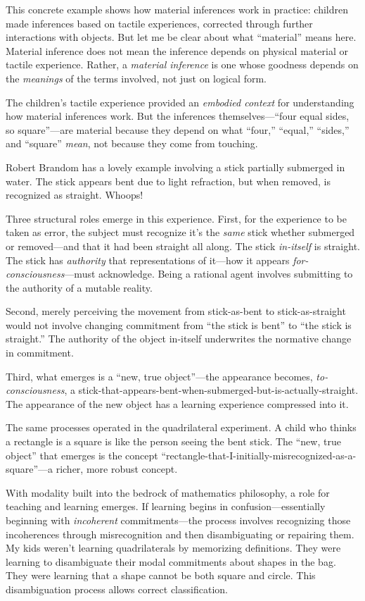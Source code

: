 \documentclass[12pt]{book}
\begin{document}
This concrete example shows how material inferences work in practice: children made inferences based on tactile experiences, corrected through further interactions with objects. But let me be clear about what ``material'' means here. Material inference does not mean the inference depends on physical material or tactile experience. Rather, a \emph{material inference} is one whose goodness depends on the \emph{meanings} of the terms involved, not just on logical form.

The children's tactile experience provided an \emph{embodied context} for understanding how material inferences work. But the inferences themselves---``four equal sides, so square''---are material because they depend on what ``four,'' ``equal,'' ``sides,'' and ``square'' \emph{mean}, not because they come from touching.

Robert Brandom \parencite*{Brandom:2019aa} has a lovely example involving a stick partially submerged in water. The stick appears bent due to light refraction, but when removed, is recognized as straight. Whoops!

Three structural roles emerge in this experience. First, for the experience to be taken as error, the subject must recognize it's the \emph{same} stick whether submerged or removed---and that it had been straight all along. The stick \emph{in-itself} is straight. The stick has \emph{authority} that representations of it---how it appears \emph{for-consciousness}---must acknowledge. Being a rational agent involves submitting to the authority of a mutable reality.

Second, merely perceiving the movement from stick-as-bent to stick-as-straight would not involve changing commitment from ``the stick is bent'' to ``the stick is straight.'' The authority of the object in-itself underwrites the normative change in commitment.

Third, what emerges is a ``new, true object''---the appearance becomes, \emph{to-consciousness}, a stick-that-appears-bent-when-submerged-but-is-actually-straight. The appearance of the new object has a learning experience compressed into it.

The same processes operated in the quadrilateral experiment. A child who thinks a rectangle is a square is like the person seeing the bent stick. The ``new, true object'' that emerges is the concept ``rectangle-that-I-initially-misrecognized-as-a-square''---a richer, more robust concept.

With modality built into the bedrock of mathematics philosophy, a role for teaching and learning emerges. If learning begins in confusion---essentially beginning with \emph{incoherent} commitments---the process involves recognizing those incoherences through misrecognition and then disambiguating or repairing them. My kids weren't learning quadrilaterals by memorizing definitions. They were learning to disambiguate their modal commitments about shapes in the bag. They were learning that a shape cannot be both square and circle. This disambiguation process allows correct classification.
\end{document}
